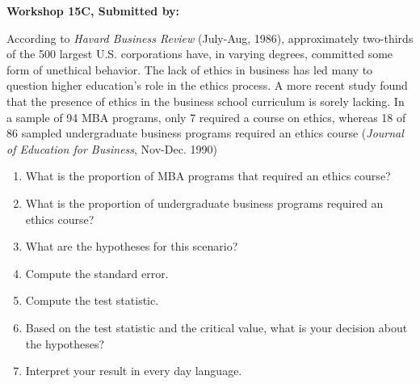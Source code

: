 \documentclass[11pt]{book}\usepackage[]{graphicx}\usepackage[]{color}
\begin{document}
\begin{exercises}
\begin{exercise}
\end{exercise}
\begin{solution}  %

\end{solution}

\clearpage

    \begin{exercise}  %

    \begin{center}
\begin{flushleft}\textbf{\large \hfill Workshop 15C, Submitted by: }\end{flushleft}

\end{center}

According to \textit{Havard Business Review} (July-Aug, 1986), approximately two-thirds of the 500 largest U.S. corporations have, in varying degrees, committed some form of unethical behavior. The lack of ethics in business has led many to question higher education’s role in the ethics process. A more recent study found that the presence of ethics in the business school curriculum is sorely lacking. In a sample of 94 MBA programs, only 7 required a course on ethics, whereas 18 of 86 sampled undergraduate business programs required an ethics course (\textit{Journal of Education for Business}, Nov-Dec. 1990)

\begin{enumerate}
\item  What is the proportion of MBA programs that required an ethics course?
\item  What is the proportion of undergraduate business programs required an ethics course?
\item  What are the hypotheses for this scenario?
\item  Compute the standard error.
\item  Compute the test statistic.
\item  Based on the test statistic and the critical value, what is your decision about the hypotheses?
\item  Interpret your result in every day language.
\end{enumerate}


\end{exercise}
\end{exercises}
\end{document}
